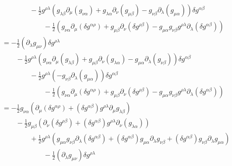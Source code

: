 \documentclass{article}
\theoremstyle{definition}
\begin{document}
\begin{align}
                                     & \qquad \qquad - \frac{1}{2} g^{\rho \lambda} \left(g_{\lambda \beta} \partial_\mu (g_{\nu \alpha}  ) + g_{\lambda\alpha} \partial_\nu ( g_{\mu \beta}) - g_{\nu\beta} \partial_\lambda (g_{\mu\alpha} ) \right)\delta g^{\alpha\beta} \nonumber \\
                                     & \qquad \qquad \qquad - \frac{1}{2}  \left(g_{\nu \alpha} \partial_\mu ( \delta g^{\alpha\rho}) +  g_{\mu \beta}\partial_\nu (\delta g^{\rho\beta}) - g_{\mu\alpha} g_{\nu\beta} g^{\rho \lambda}\partial_\lambda (\delta g^{\alpha\beta}) \right) \\
                                     &= - \frac{1}{2} (\partial_\lambda g_{\mu\nu})\delta g^{\rho\lambda} \nonumber \\
                                     & \qquad - \frac{1}{2} g^{\rho \lambda} \left(g_{\nu \alpha}\partial_\mu ( g_{\lambda \beta} ) + g_{\mu \beta} \partial_\nu (g_{\lambda\alpha} ) - g_{\mu\alpha} \partial_\lambda ( g_{\nu\beta}) \right)\delta g^{\alpha\beta} \nonumber \\
                                     & \qquad \qquad - \frac{1}{2} g^{\rho \lambda} \left( - g_{\nu\beta} \partial_\lambda (g_{\mu\alpha} ) \right)\delta g^{\alpha\beta} \nonumber \\
                                     & \qquad \qquad \qquad - \frac{1}{2}  \left(g_{\nu \alpha} \partial_\mu ( \delta g^{\alpha\rho}) +  g_{\mu \beta}\partial_\nu (\delta g^{\rho\beta}) - g_{\mu\alpha} g_{\nu\beta} g^{\rho \lambda}\partial_\lambda (\delta g^{\alpha\beta}) \right) \nonumber \\
                                     &= - \frac{1}{2} g_{\nu\alpha} \left( \partial_\mu (\delta g^{\alpha \rho}) + (\delta g^{\alpha\beta}) g^{\rho \lambda} \partial_\mu g_{\lambda \beta}  \right) \nonumber \\
                                     & \qquad - \frac{1}{2} g_{\mu\beta} \left( \partial_\nu (\delta g^{\rho\beta}) + (\delta g^{\alpha\beta})g^{\rho\lambda} \partial_\nu (g_{\lambda\alpha}) \right) \nonumber \\
                                     & \qquad \qquad + \frac{1}{2} g^{\rho\lambda} \left( g_{\mu\alpha} g_{\nu\beta} \partial_\lambda (\delta g^{\alpha\beta}) + (\delta g^{\alpha\beta})g_{\mu\alpha} \partial_{\lambda} g_{\nu\beta} + (\delta g^{\alpha\beta})g_{\nu\beta} \partial_\lambda g_{\mu\alpha} \right) \nonumber \\
                                     & \qquad \qquad \qquad - \frac{1}{2} (\partial_\lambda g_{\mu\nu}) \delta g^{\rho\lambda}  
\end{align}
\end{document}
